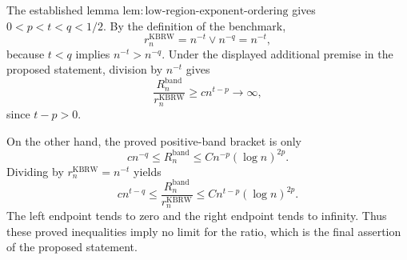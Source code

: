 The established lemma
\(\mathrm{lem:low\mbox{-}region\mbox{-}exponent\mbox{-}ordering}\) gives
\(0<p<t<q<1/2\).  By the definition of the benchmark,
\[
r_n^{\mathrm{KBRW}}=n^{-t}\vee n^{-q}=n^{-t},
\]
because \(t<q\) implies \(n^{-t}>n^{-q}\).  Under the displayed additional
premise in the proposed statement, division by \(n^{-t}\) gives
\[
\frac{R_n^{\mathrm{band}}}{r_n^{\mathrm{KBRW}}}
\geq c n^{t-p}\longrightarrow\infty,
\]
since \(t-p>0\).

On the other hand, the proved positive-band bracket is only
\[
c n^{-q}\leq R_n^{\mathrm{band}}
\leq Cn^{-p}(\log n)^{2p}.
\]
Dividing by \(r_n^{\mathrm{KBRW}}=n^{-t}\) yields
\[
c n^{t-q}\leq
\frac{R_n^{\mathrm{band}}}{r_n^{\mathrm{KBRW}}}
\leq Cn^{t-p}(\log n)^{2p}.
\]
The left endpoint tends to zero and the right endpoint tends to infinity.
Thus these proved inequalities imply no limit for the ratio, which is the
final assertion of the proposed statement.